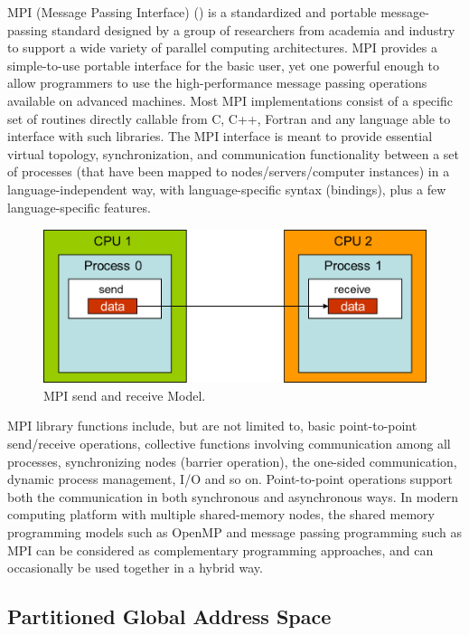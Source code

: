 MPI (Message Passing Interface) (\cite{gropp1999using}) is a standardized and portable message-passing standard designed by a group of researchers from academia and industry to support a wide variety of parallel computing architectures. MPI provides a simple-to-use portable interface for the basic user, yet one powerful enough to allow programmers to use the high-performance message passing operations available on advanced machines. Most MPI implementations consist of a specific set of routines directly callable from C, C++, Fortran and any language able to interface with such libraries. The MPI interface is meant to provide essential virtual topology, synchronization, and communication functionality between a set of processes (that have been mapped to nodes/servers/computer instances) in a language-independent way, with language-specific syntax (bindings), plus a few language-specific features. 

\begin{figure}[htbp]
	\centering
	\includegraphics[width=5.4in]{fig/mpi_send_recv.jpg}
	\caption{MPI send and receive Model.}
	\label{mpi_model}
\end{figure}

MPI library functions include, but are not limited to, basic point-to-point send/receive operations, collective functions involving communication among all processes, synchronizing nodes (barrier operation), the one-sided communication, dynamic process management, I/O and so on. Point-to-point operations support both the communication in both synchronous and asynchronous ways. In modern computing platform with multiple shared-memory nodes, the shared memory programming models such as OpenMP and message passing programming such as MPI can be considered as complementary programming approaches, and can occasionally be used together in a hybrid way.

\subsection{Partitioned Global Address Space}

